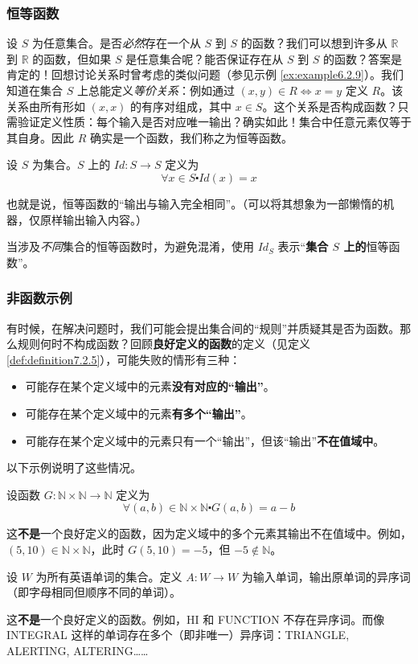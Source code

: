 \subsubsection*{恒等函数}

设 $S$ 为任意集合。是否\emph{必然}存在一个从 $S$ 到 $S$ 的函数？我们可以想到许多从 $\mathbb{R}$ 到 $\mathbb{R}$ 的函数，但如果 $S$ 是任意集合呢？能否保证存在从 $S$ 到 $S$ 的函数？答案是肯定的！回想讨论关系时曾考虑的类似问题（参见示例 \ref{ex:example6.2.9}）。我们知道在集合 $S$ 上总能定义\emph{等价关系}：例如通过 $(x, y) \in R \iff x = y$ 定义 $R$。该关系由所有形如 $(x, x)$ 的有序对组成，其中 $x \in S$。这个关系是否构成函数？只需验证定义性质：每个输入是否对应唯一输出？确实如此！集合中任意元素仅等于其自身。因此 $R$ 确实是一个函数，我们称之为恒等函数。

\begin{definition}[恒等函数]
    设 $S$ 为集合。$S$ 上的 $Id : S \to S$ 定义为
    \[\forall x \in S \centerdot Id(x) = x\]
\end{definition}

也就是说，恒等函数的``输出与输入完全相同''。（可以将其想象为一部懒惰的机器，仅原样输出输入内容。）

当涉及\emph{不同}集合的恒等函数时，为避免混淆，使用 $Id_S$ 表示``\textbf{集合 $S$ 上的}恒等函数''。

\subsubsection*{非函数示例}

有时候，在解决问题时，我们可能会提出集合间的``规则''并质疑其是否为函数。那么规则何时不构成函数？回顾\textbf{良好定义的函数}的定义（见定义 \ref{def:definition7.2.5}），可能失败的情形有三种：

\begin{itemize}
    \item 可能存在某个定义域中的元素\textbf{没有对应的``输出''}。
    \item 可能存在某个定义域中的元素\textbf{有多个``输出''}。
    \item 可能存在某个定义域中的元素只有一个``输出''，但该``输出''\textbf{不在值域中}。
\end{itemize}
以下示例说明了这些情况。\\

\begin{example}
    设函数 $G : \mathbb{N} \times \mathbb{N} \to \mathbb{N}$ 定义为
    \[\forall (a, b) \in \mathbb{N} \times \mathbb{N} \centerdot G(a, b) = a - b\]

    这\textbf{不是}一个良好定义的函数，因为定义域中的多个元素其输出不在值域中。例如，$(5, 10) \in \mathbb{N} \times \mathbb{N}$，此时 $G(5, 10) = -5$，但 $-5 \notin \mathbb{N}$。
\end{example}

\clearpage

\begin{example}
    设 $W$ 为所有英语单词的集合。定义 $A: W \to W$ 为输入单词，输出原单词的异序词（即字母相同但顺序不同的单词）。
    
    这\textbf{不是}一个良好定义的函数。例如，HI 和 FUNCTION 不存在异序词。而像 INTEGRAL 这样的单词存在多个（即非唯一）异序词：TRIANGLE, ALERTING, ALTERING……
\end{example}